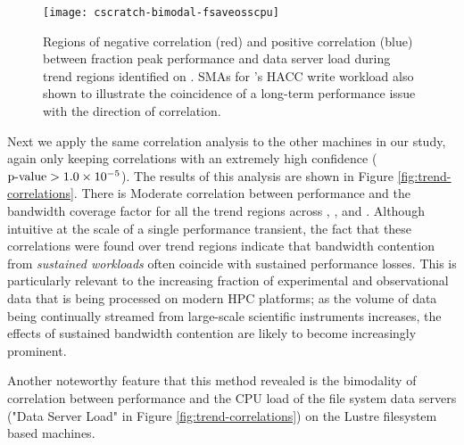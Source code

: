 \begin{figure}
    \centering
    \texttt{[image: cscratch-bimodal-fsaveosscpu]}
    \vspace{-.35in}
    \caption{Regions of negative correlation (red) and positive correlation (blue) between fraction peak performance and data server load during trend regions identified on \cori.
    SMAs for \cori's HACC write workload also shown to illustrate the coincidence of a long-term performance issue with the direction of correlation.}
    \label{fig:cscratch-bimodal-fsaveosscpu}
\end{figure}


Next we apply the same correlation analysis to the other machines in our study, again only keeping correlations with an extremely high confidence ($\textup{p-value} > {1.0 \times 10^{-5}}$). 
The results of this analysis are shown in Figure \ref{fig:trend-correlations}. There is Moderate correlation between performance and the bandwidth coverage factor for all the trend regions across \mira, \cori, and \edison.
Although intuitive at the scale of a single performance transient, the fact that these correlations were found over trend regions indicate that bandwidth contention from \emph{sustained workloads} often coincide with sustained performance losses.
This is particularly relevant to the increasing fraction of experimental and observational data that is being processed on modern HPC platforms; as the volume of data being continually streamed from large-scale scientific instruments increases, the effects of sustained bandwidth contention are likely to become increasingly prominent.

Another noteworthy feature that this method revealed is the bimodality of correlation between performance and the CPU load of the file system data servers ("Data Server Load" in Figure \ref{fig:trend-correlations}) on the Lustre filesystem based machines.

